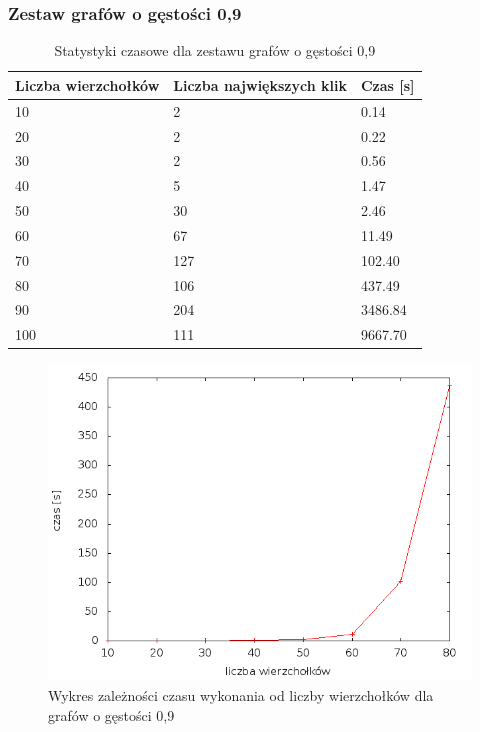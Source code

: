 \documentclass[12pt, a4paper]{article}
\begin{document}
\subsubsection*{Zestaw grafów o gęstości 0,9}
\begin{table}[H]
\caption{Statystyki czasowe dla zestawu grafów o gęstości 0,9}
\begin{center}
    \begin{tabular}{|l|l|l|}
    \hline
    Liczba wierzchołków & Liczba największych klik & Czas [s] \\ \hline
    10 & 2 & 0.14 \\ \hline
    20 & 2 & 0.22 \\ \hline
    30 & 2 & 0.56 \\ \hline
    40 & 5 & 1.47 \\ \hline
    50 & 30 & 2.46 \\ \hline
    60 & 67 & 11.49 \\ \hline
    70 & 127 & 102.40 \\ \hline
    80 & 106 & 437.49 \\ \hline
    90 & 204 & 3486.84 \\ \hline
    100 & 111 & 9667.70 \\ \hline
    \end{tabular}
\end{center}
\end{table}

\begin{figure}[h]
    \begin{center}
	\includegraphics[scale=0.5]{../experiment_1/img/den/den_09.png}
	\caption{Wykres zależności czasu wykonania od liczby wierzchołków dla grafów o gęstości 0,9}
    \end{center}
\end{figure}
\end{document}
